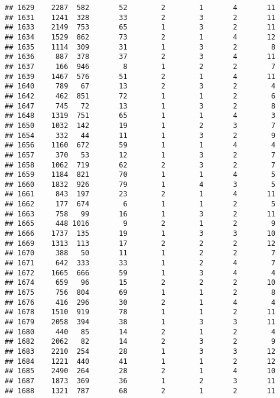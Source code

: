 \documentclass[]{article}
\begin{document}
\begin{verbatim}
## 1629    2287  582       52        2        1       4       11
## 1631    1241  328       33        2        3       2       11
## 1633    2149  753       65        1        3       2       11
## 1634    1529  862       73        2        1       4       12
## 1635    1114  309       31        1        3       2        8
## 1636     887  378       37        2        3       4       11
## 1637     166  946        8        1        2       2        7
## 1639    1467  576       51        2        1       4       11
## 1640     789   67       13        2        3       2        4
## 1642     462  851       72        1        1       2        6
## 1647     745   72       13        1        3       2        8
## 1648    1319  751       65        1        1       4        3
## 1650    1032  142       19        1        2       3        7
## 1654     332   44       11        1        3       2        9
## 1656    1160  672       59        1        1       4        4
## 1657     370   53       12        1        3       2        7
## 1658    1062  719       62        2        3       2        7
## 1659    1184  821       70        1        1       4        5
## 1660    1832  926       79        1        4       3        5
## 1661     843  197       23        2        1       4       11
## 1662     177  674        6        1        1       2        5
## 1663     758   99       16        1        3       2       11
## 1665     448 1016        9        2        1       2        9
## 1666    1737  135       19        1        3       3       10
## 1669    1313  113       17        2        2       2       12
## 1670     388   50       11        1        2       2        7
## 1671     642  333       33        1        2       4        7
## 1672    1665  666       59        1        3       4        4
## 1674     659   96       15        2        2       2       10
## 1675     756  804       69        1        1       2        8
## 1676     416  296       30        2        1       4        4
## 1678    1510  919       78        1        1       2       11
## 1679    2058  394       38        1        3       3       11
## 1680     440   85       14        2        1       2        4
## 1682    2062   82       14        2        3       2        9
## 1683    2210  254       28        1        3       3       12
## 1684    1221  440       41        1        1       2       12
## 1685    2490  264       28        2        1       4       10
## 1687    1873  369       36        1        2       3       11
## 1688    1321  787       68        2        1       2       11

\end{verbatim}
\end{document}
